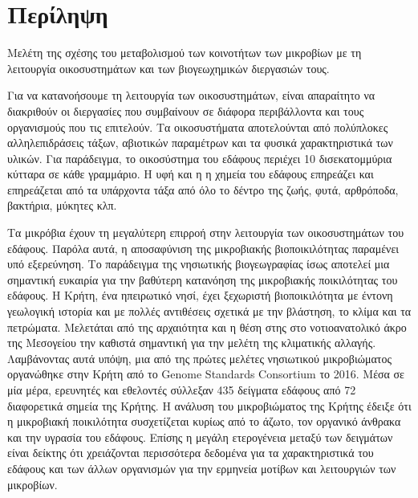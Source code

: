 \documentclass[11pt]{article}
\begin{document}
\section*{Περίληψη}
{\LARGE Μελέτη της σχέσης του μεταβολισμού των κοινοτήτων των μικροβίων με τη λειτουργία οικοσυστημάτων και των βιογεωχημικών διεργασιών τους.}


\vspace{1cm}

Για να κατανοήσουμε τη λειτουργία των οικοσυστημάτων, είναι απαραίτητο να διακριθούν
οι διεργασίες που συμβαίνουν σε διάφορα περιβάλλοντα και τους οργανισμούς
που τις επιτελούν. Τα οικοσυστήματα αποτελούνται από πολύπλοκες αλληλεπιδράσεις τάξων,
αβιοτικών παραμέτρων και τα φυσικά χαρακτηριστικά των υλικών. Για παράδειγμα,
το οικοσύστημα του εδάφους περιέχει 10 δισεκατομμύρια κύτταρα σε κάθε γραμμάριο. Η υφή και η
η χημεία του εδάφους επηρεάζει και επηρεάζεται από τα υπάρχοντα τάξα από όλο το
δέντρο της ζωής, φυτά, αρθρόποδα, βακτήρια, μύκητες κλπ.

Τα μικρόβια έχουν τη μεγαλύτερη επιρροή στην λειτουργία των οικοσυστημάτων του εδάφους. 
Παρόλα αυτά, η αποσαφύνιση της μικροβιακής βιοποικιλότητας παραμένει υπό εξερεύνηση.
Το παράδειγμα της νησιωτικής βιογεωγραφίας ίσως αποτελεί μια σημαντική ευκαιρία για 
την βαθύτερη κατανόηση της μικροβιακής ποικιλότητας του εδάφους. 
Η Κρήτη, ένα ηπειρωτικό νησί, έχει ξεχωριστή βιοποικιλότητα με έντονη γεωλογική 
ιστορία και με πολλές αντιθέσεις σχετικά με την βλάστηση, το κλίμα και τα πετρώματα. 
Μελετάται από της αρχαιότητα και η θέση στης στο νοτιοανατολικό άκρο της Μεσογείου 
την καθιστά σημαντική για την μελέτη της κλιματικής αλλαγής.
Λαμβάνοντας αυτά υπόψη, μια από της πρώτες μελέτες νησιωτικού μικροβιώματος 
οργανώθηκε στην Κρήτη από το \textlatin{Genome Standards Consortium} το 2016. 
Μέσα σε μία μέρα, ερευνητές και εθελοντές σύλλεξαν 435 δείγματα εδάφους 
από 72 διαφορετικά σημεία της Κρήτης. 
Η ανάλυση του μικροβιώματος της Κρήτης έδειξε ότι η μικροβιακή ποικιλότητα
συσχετίζεται κυρίως από το άζωτο, τον οργανικό άνθρακα και την υγρασία του εδάφους.
Επίσης η μεγάλη ετερογένεια μεταξύ των δειγμάτων είναι δείκτης ότι χρειάζονται περισσότερα 
δεδομένα για τα χαρακτηριστικά του εδάφους και των άλλων οργανισμών για την ερμηνεία μοτίβων και λειτουργιών 
των μικροβίων.
\end{document}
